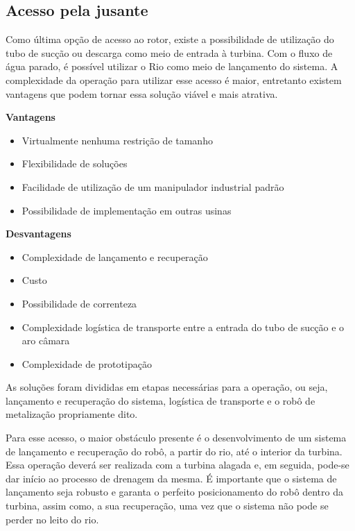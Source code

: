 \subsection{Acesso pela jusante}


Como última opção de acesso ao rotor, existe a possibilidade de utilização do
tubo de sucção ou descarga como meio de entrada à turbina. Com o fluxo de água
parado, é possível utilizar o Rio como meio de lançamento do sistema. A
complexidade da operação para utilizar esse acesso é maior, entretanto existem
vantagens que podem tornar essa solução viável e mais atrativa.

\textbf{Vantagens}
\begin{itemize}
  \item Virtualmente nenhuma restrição de tamanho
  \item Flexibilidade de soluções
  \item Facilidade de utilização de um manipulador industrial padrão
  \item Possibilidade de implementação em outras usinas
\end{itemize}

\textbf{Desvantagens}
\begin{itemize}
  \item Complexidade de lançamento e recuperação
  \item Custo
  \item Possibilidade de correnteza
  \item Complexidade logística de transporte entre a entrada do tubo de sucção e
  o aro câmara
  \item Complexidade de prototipação
\end{itemize}

As soluções foram divididas em etapas necessárias para a operação, ou
seja, lançamento e recuperação do sistema, logística de transporte e o robô de
metalização propriamente dito.

Para esse acesso, o maior obstáculo presente é o desenvolvimento de um sistema
de lançamento e recuperação do robô, a partir do rio, até o interior da turbina.
Essa operação deverá ser realizada com a turbina alagada e, em seguida,
pode-se dar início ao processo de drenagem da
mesma.
É importante que o sistema de lançamento seja robusto e garanta o perfeito posicionamento do robô dentro da turbina, assim
como, a sua recuperação, uma vez que o sistema não pode se perder no leito do
rio.

